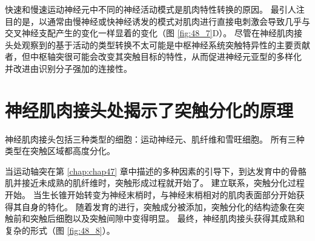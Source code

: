 快速和慢速运动神经元中不同的神经活动模式是肌肉特性转换的原因。 最引人注目的是，以通常由慢神经或快神经诱发的模式对肌肉进行直接电刺激会导致几乎与交叉神经支配产生的变化一样显着的变化（图 \ref{fig:48_7}D）。 尽管在神经肌肉接头处观察到的基于活动的类型转换不太可能是中枢神经系统突触特异性的主要贡献者，但中枢轴突很可能会改变其突触目标的特性，从而促进神经元亚型的多样化 并改进由识别分子强加的连接性。


\section{神经肌肉接头处揭示了突触分化的原理}
神经肌肉接头包括三种类型的细胞：运动神经元、肌纤维和雪旺细胞。 所有三种类型在突触区域都高度分化。

当运动轴突在第 \ref{chap:chap47} 章中描述的多种因素的引导下，到达发育中的骨骼肌并接近未成熟的肌纤维时，突触形成过程就开始了。 建立联系，突触分化过程开始。 当生长锥开始转变为神经末梢时，与神经末梢相对的肌肉表面部分开始获得其自身的特化。 随着发育的进行，突触成分被添加，突触分化的结构迹象在突触前和突触后细胞以及突触间隙中变得明显。 
最终，神经肌肉接头获得其成熟和复杂的形式（图 \ref{fig:48_8}）。

